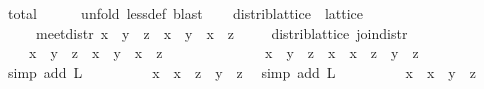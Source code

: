 \begin{isabellebody}
\ total\isanewline
\ \ \ \ \isamarkupfalse%
\ {\isacharparenleft}unfold\ less{\isacharunderscore}def{\isacharparenright}\ blast%
\endisatagproof
{\isafoldproof}%
%
\isadelimproof
\isanewline
%
\endisadelimproof
\isanewline
\ \ \isamarkupfalse%
\ distrib{\isacharunderscore}lattice\ {\isacharequal}\ lattice\ {\isacharplus}\isanewline
\ \ \ \ \ meet{\isacharunderscore}distr{\isacharcolon}\ {\isachardoublequoteopen}x\ {\isasymsqinter}\ {\isacharparenleft}y\ {\isasymsqunion}\ z{\isacharparenright}\ {\isacharequal}\ x\ {\isasymsqinter}\ y\ {\isasymsqunion}\ x\ {\isasymsqinter}\ z{\isachardoublequoteclose}\isanewline
\isanewline
\ \ \isamarkupfalse%
\ {\isacharparenleft}\ distrib{\isacharunderscore}lattice{\isacharparenright}\ join{\isacharunderscore}distr{\isacharcolon}\isanewline
\ \ \ \ {\isachardoublequoteopen}x\ {\isasymsqunion}\ {\isacharparenleft}y\ {\isasymsqinter}\ z{\isacharparenright}\ {\isacharequal}\ {\isacharparenleft}x\ {\isasymsqunion}\ y{\isacharparenright}\ {\isasymsqinter}\ {\isacharparenleft}x\ {\isasymsqunion}\ z{\isacharparenright}{\isachardoublequoteclose}\ \ \isanewline
%
\isadelimproof
\ \ \ \ %
\endisadelimproof
%
\isatagproof
{}\isamarkupfalse%
\ {\isacharminus}\isanewline
\ \ \ \ \isamarkupfalse%
\ {\isachardoublequoteopen}x\ {\isasymsqunion}\ {\isacharparenleft}y\ {\isasymsqinter}\ z{\isacharparenright}\ {\isacharequal}\ {\isacharparenleft}x\ {\isasymsqunion}\ {\isacharparenleft}x\ {\isasymsqinter}\ z{\isacharparenright}{\isacharparenright}\ {\isasymsqunion}\ {\isacharparenleft}y\ {\isasymsqinter}\ z{\isacharparenright}{\isachardoublequoteclose}\ \isamarkupfalse%
\ {\isacharparenleft}simp\ add{\isacharcolon}\ L{}{\isacharparenright}\isanewline
\ \ \ \ \isamarkupfalse%
\ \isamarkupfalse%
\ {\isachardoublequoteopen}{\isachardot}{\isachardot}{\isachardot}\ {\isacharequal}\ x\ {\isasymsqunion}\ {\isacharparenleft}{\isacharparenleft}x\ {\isasymsqinter}\ z{\isacharparenright}\ {\isasymsqunion}\ {\isacharparenleft}y\ {\isasymsqinter}\ z{\isacharparenright}{\isacharparenright}{\isachardoublequoteclose}\ \isamarkupfalse%
\ {\isacharparenleft}simp\ add{\isacharcolon}\ L{}{\isacharparenright}\isanewline
\ \ \ \ \isamarkupfalse%
\ \isamarkupfalse%
\ {\isachardoublequoteopen}{\isachardot}{\isachardot}{\isachardot}\ {\isacharequal}\ x\ {\isasymsqunion}\ {\isacharparenleft}{\isacharparenleft}x\ {\isasymsqunion}\ y{\isacharparenright}\ {\isasymsqinter}\ z{\isacharparenright}{\isachardoublequoteclose}\ \isamarkupfalse%

\end{isabellebody}
